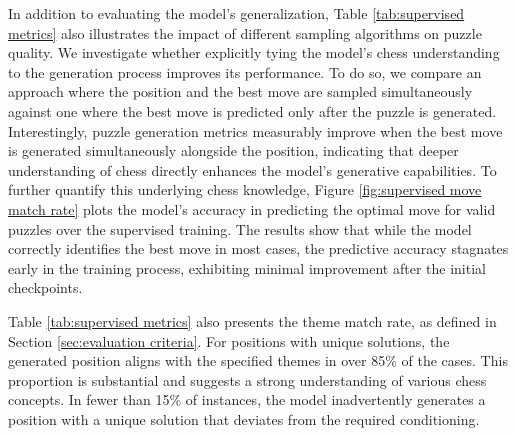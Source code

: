 In addition to evaluating the model's generalization, Table \ref{tab:supervised metrics} also illustrates the impact of different sampling algorithms on puzzle quality. We investigate whether explicitly tying the model's chess understanding to the generation process improves its performance. To do so, we compare an approach where the position and the best move are sampled simultaneously against one where the best move is predicted only after the puzzle is generated. Interestingly, puzzle generation metrics measurably improve when the best move is generated simultaneously alongside the position, indicating that deeper understanding of chess directly enhances the model's generative capabilities. To further quantify this underlying chess knowledge, Figure \ref{fig:supervised move match rate} plots the model's accuracy in predicting the optimal move for valid puzzles over the supervised training. The results show that while the model correctly identifies the best move in most cases, the predictive accuracy stagnates early in the training process, exhibiting minimal improvement after the initial checkpoints.

Table \ref{tab:supervised metrics} also presents the theme match rate, as defined in Section \ref{sec:evaluation criteria}. For positions with unique solutions, the generated position aligns with the specified themes in over 85\% of the cases. This proportion is substantial and suggests a strong understanding of various chess concepts. In fewer than 15\% of instances, the model inadvertently generates a position with a unique solution that deviates from the required conditioning.


